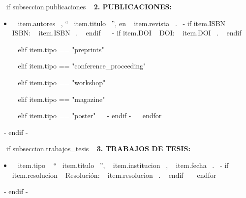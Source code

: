     ~{ if subseccion.publicaciones }~
      \textbf{2. PUBLICACIONES:}
      \begin{itemize}
      ~{ for item in subseccion.publicaciones }~
        ~{ if item.tipo == "articulo" }~
          \item ~{{ item.autores }}~, ``~{{ item.titulo }}~'', en ~{{ item.revista }}~.
                ~{- if item.ISBN }~ ISBN: ~{{ item.ISBN }}~. ~{ endif }~
                ~{- if item.DOI }~ DOI: ~{{ item.DOI }}~. ~{ endif }~
          \espacioEntreItems{}

        ~{ elif item.tipo == "preprints" }~

        ~{ elif item.tipo == "conference_proceeding" }~

        ~{ elif item.tipo == "workshop" }~

        ~{ elif item.tipo == "magazine" }~

        ~{ elif item.tipo == "poster" }~
        ~{- endif -}~
      ~{ endfor }~
      \end{itemize}
      \espacioEntreSubSecciones{}
    ~{- endif -}~

    ~{ if subseccion.trabajos_tesis }~
      \textbf{3. TRABAJOS DE TESIS:}
      \begin{itemize}
      ~{ for item in subseccion.trabajos_tesis }~
        \item ~{{ item.tipo }}~ ``~{{ item.titulo }}~'', ~{{ item.institucion }}~, ~{{ item.fecha }}~.
              ~{- if item.resolucion }~ Resolución: ~{{ item.resolucion }}~. ~{ endif }~
        \espacioEntreItems{}
      ~{ endfor }~
      \end{itemize}
      \espacioEntreSubSecciones{}
    ~{- endif -}~


